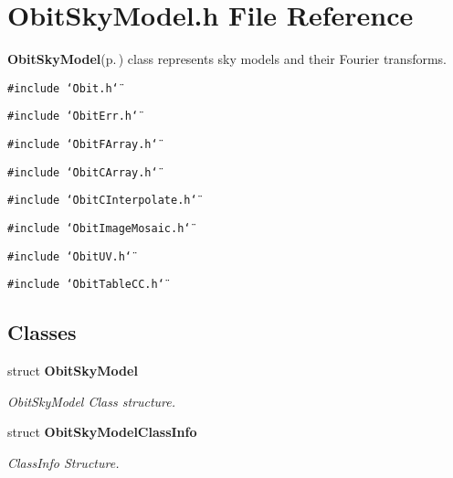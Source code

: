 \section{Obit\-Sky\-Model.h File Reference}
\label{ObitSkyModel_8h}
{\bf Obit\-Sky\-Model}{\rm (p.\,\pageref{structObitSkyModel})} class represents sky models and their Fourier transforms. 

{\tt \#include \char`\"{}Obit.h\char`\"{}}\par
{\tt \#include \char`\"{}Obit\-Err.h\char`\"{}}\par
{\tt \#include \char`\"{}Obit\-FArray.h\char`\"{}}\par
{\tt \#include \char`\"{}Obit\-CArray.h\char`\"{}}\par
{\tt \#include \char`\"{}Obit\-CInterpolate.h\char`\"{}}\par
{\tt \#include \char`\"{}Obit\-Image\-Mosaic.h\char`\"{}}\par
{\tt \#include \char`\"{}Obit\-UV.h\char`\"{}}\par
{\tt \#include \char`\"{}Obit\-Table\-CC.h\char`\"{}}\par
\subsection*{Classes}
\begin{CompactItemize}
\item 
struct {\bf Obit\-Sky\-Model}
\begin{CompactList}\small\item\em Obit\-Sky\-Model Class structure. \item\end{CompactList}\item 
struct {\bf Obit\-Sky\-Model\-Class\-Info}
\begin{CompactList}\small\item\em Class\-Info Structure. \item\end{CompactList}\end{CompactItemize}
